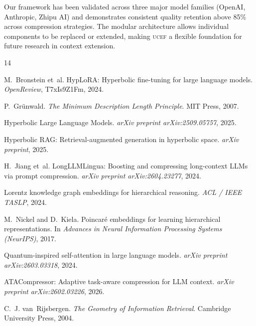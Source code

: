 \documentclass[11pt,letterpaper]{article}
\newcommand{\ucef}{\textsc{ucef}}
\begin{document}
Our framework has been validated across three major model families (OpenAI,
Anthropic, Zhipu AI) and demonstrates consistent quality retention above
85\% across compression strategies.  The modular architecture allows
individual components to be replaced or extended, making \ucef{} a flexible
foundation for future research in context extension.




\begin{thebibliography}{14}

M.~Bronstein et~al.
\newblock HypLoRA: Hyperbolic fine-tuning for large language models.
\newblock \emph{OpenReview}, T7xIs9Z1Fm, 2024.

P.~Gr\"{u}nwald.
\newblock \emph{The Minimum Description Length Principle}.
\newblock MIT Press, 2007.

Hyperbolic Large Language Models.
\newblock \emph{arXiv preprint arXiv:2509.05757}, 2025.

Hyperbolic RAG: Retrieval-augmented generation in hyperbolic space.
\newblock \emph{arXiv preprint}, 2025.

H.~Jiang et~al.
\newblock LongLLMLingua: Boosting and compressing long-context {LLMs}
  via prompt compression.
\newblock \emph{arXiv preprint arXiv:2604.23277}, 2024.

Lorentz knowledge graph embeddings for hierarchical reasoning.
\newblock \emph{ACL / IEEE TASLP}, 2024.

M.~Nickel and D.~Kiela.
\newblock Poincar\'{e} embeddings for learning hierarchical
  representations.
\newblock In \emph{Advances in Neural Information Processing Systems
  (NeurIPS)}, 2017.

Quantum-inspired self-attention in large language models.
\newblock \emph{arXiv preprint arXiv:2603.03318}, 2024.

ATACompressor: Adaptive task-aware compression for {LLM} context.
\newblock \emph{arXiv preprint arXiv:2602.03226}, 2026.

C.~J. van~Rijsbergen.
\newblock \emph{The Geometry of Information Retrieval}.
\newblock Cambridge University Press, 2004.


\end{thebibliography}
\end{document}

